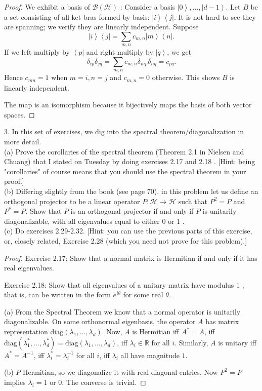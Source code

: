 \begin{proof}
	We exhibit a basis of $\mathcal{B}(\mathscr{H})$ : Consider a basis $\left| 0 \right\rangle , \ldots, \left| d- 1 \right\rangle $. Let $B$ be a set consisting of all ket-bras formed by basis: $\left| i \right\rangle \left\langle j \right| $. It is not hard to see they are spanning; we verify they are linearly independent. Suppose
	\[
		\left| i \right\rangle \left\langle j \right|  = \sum_{m, n} c_{m, n} \left| m \right\rangle  \left\langle n \right| 
	.\] 
	If we left multiply by $\left\langle p \right| $ and right multiply by $\left| q \right\rangle $, we get
	\[
		\delta_{i p} \delta_{j q} = \sum_{m, n} c_{m, n} \delta_{m p} \delta_{n q} = c_{p q}
	.\] 
	Hence $c_{m n} = 1$ when $m = i, n = j$ and $c_{m, n} = 0 $ otherwise. This shows $B$ is linearly independent.


	The map is an isomorphism because it bijectively maps the basis of both vector spaces. 
\end{proof}

\begin{problem}
3. In this set of exercises, we dig into the spectral theorem/diagonalization in more detail.\\
(a) Prove the corollaries of the spectral theorem (Theorem 2.1 in Nielsen and Chuang) that I stated on Tuesday by doing exercises 2.17 and 2.18 . [Hint: being "corollaries" of course means that you should use the spectral theorem in your proof.]\\
(b) Differing slightly from the book (see page 70), in this problem let us define an orthogonal projector to be a linear operator $P: \mathcal{H} \rightarrow \mathcal{H}$ such that $P^2=P$ and $P^*=P$. Show that $P$ is an orthogonal projector if and only if $P$ is unitarily diagonalizable, with all eigenvalues equal to either 0 or 1 .\\
(c) Do exercises 2.29-2.32. [Hint: you can use the previous parts of this exercise, or, closely related, Exercise 2.28 (which you need not prove for this problem).]\\
\end{problem}
\begin{proof}
Exercise 2.17: Show that a normal matrix is Hermitian if and only if it has real eigenvalues.	

Exercise 2.18: Show that all eigenvalues of a unitary matrix have modulus 1 , that is, can be written in the form $e^{i \theta}$ for some real $\theta$.

(a)
From the Spectral Theorem we know that a normal operator is unitarily diagonalizable. On some orthonormal eigenbasis, the operator $A$ has matrix representation $\text{diag}(\lambda_1, \ldots, \lambda_d)$. Now, $A$ is Hermitian iff $A^* = A$, iff $\text{diag}(\lambda_1^*, \ldots, \lambda_d^*) = \text{diag}(\lambda_1, \ldots, \lambda_d)$, iff $\lambda_i \in \mathbb{R}$ for all $i$. Similarly, $A$ is unitary iff $A^* = A^{-1}$, iff $\lambda_i^* = \lambda_i^{-1}$ for all $i$, iff $\lambda_i$ all have magnitude $1$.


(b) 
$P$ Hermitian, so we diagonalize it with real diagonal entries. Now $P^2 = P$ implies $\lambda_i = 1$ or $0$. The converse is trivial.
\end{proof}

